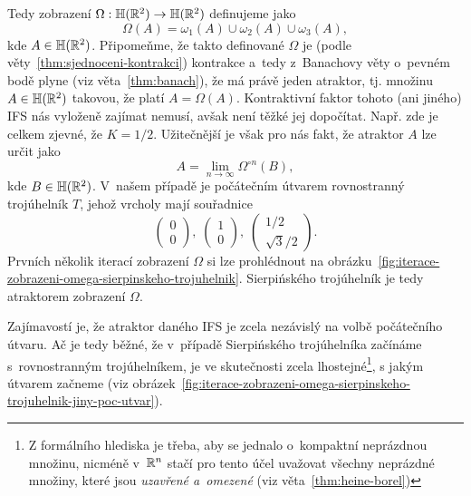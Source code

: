 Tedy zobrazení $\Omega:\mathbb{H}(\mathbb{R}^2) \rightarrow \mathbb{H}(\mathbb{R}^2)$ definujeme jako
\[\Omega(A)=\omega_1(A)\cup\omega_2(A)\cup\omega_3(A),\]
kde $A\in\mathbb{H}(\mathbb{R}^2)$. Připomeňme, že takto definované $\Omega$ je (podle věty~\ref{thm:sjednoceni-kontrakci}) kontrakce a~tedy z~Banachovy věty o~pevném bodě plyne (viz věta~\ref{thm:banach}), že má právě jeden atraktor, tj. množinu $A\in\mathbb{H}(\mathbb{R}^2)$ takovou, že platí $A=\Omega(A)$. Kontraktivní faktor tohoto (ani jiného) IFS nás vyloženě zajímat nemusí, avšak není těžké jej dopočítat. Např. zde je celkem zjevné, že $K=1/2$. Užitečnější je však pro nás fakt, že atraktor $A$ lze určit jako
\[A=\lim_{n\to\infty}\Omega^{\circ n}(B),\]
kde $B\in\mathbb{H}(\mathbb{R}^2)$. V~našem případě je počátečním útvarem rovnostranný trojúhelník $T$, jehož vrcholy mají souřadnice
\[\left(\begin{matrix}
    0\\
    0
\end{matrix}\right),\;\left(\begin{matrix}
    1\\
    0
\end{matrix}\right),\;\left(\begin{matrix}
    1/2\\
    \sqrt{3}/2
\end{matrix}\right).\]
Prvních několik iterací zobrazení $\Omega$ si lze prohlédnout na obrázku~\ref{fig:iterace-zobrazeni-omega-sierpinskeho-trojuhelnik}. Sierpińského trojúhelník je tedy atraktorem zobrazení $\Omega$.

Zajímavostí je, že atraktor daného IFS je zcela nezávislý na volbě počátečního útvaru. Ač je tedy běžné, že v~případě Sierpińského trojúhelníka začínáme s~rovnostranným trojúhelníkem, je ve skutečnosti zcela lhostejné\footnote{Z formálního hlediska je třeba, aby se jednalo o~kompaktní neprázdnou množinu, nicméně v~$\mathbb{R}^n$ stačí pro tento účel uvažovat všechny neprázdné množiny, které jsou \emph{uzavřené a~omezené} (viz věta~\ref{thm:heine-borel})}, s jakým útvarem začneme (viz obrázek~\ref{fig:iterace-zobrazeni-omega-sierpinskeho-trojuhelnik-jiny-poc-utvar}).

